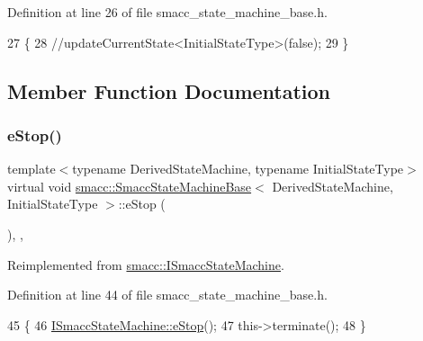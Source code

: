 Definition at line 26 of file smacc\+\_\+state\+\_\+machine\+\_\+base.\+h.


\begin{DoxyCode}
27     \{
28         \textcolor{comment}{//updateCurrentState<InitialStateType>(false);}
29     \}
\end{DoxyCode}


\subsection{Member Function Documentation}
\mbox{\label{structsmacc_1_1SmaccStateMachineBase_a3ba186af957cfe4ddbd7bdbe10630743}} 
\subsubsection{\texorpdfstring{e\+Stop()}{eStop()}}
{\footnotesize\ttfamily template$<$typename Derived\+State\+Machine, typename Initial\+State\+Type$>$ \\
virtual void \hyperlink{structsmacc_1_1SmaccStateMachineBase}{smacc\+::\+Smacc\+State\+Machine\+Base}$<$ Derived\+State\+Machine, Initial\+State\+Type $>$\+::e\+Stop (\begin{DoxyParamCaption}{ }\end{DoxyParamCaption})\hspace{0.3cm}{\ttfamily [inline]}, {\ttfamily [override]}, {\ttfamily [virtual]}}



Reimplemented from \hyperlink{classsmacc_1_1ISmaccStateMachine_a66a2900be8629748dab7a5c5ab6ae94e}{smacc\+::\+I\+Smacc\+State\+Machine}.



Definition at line 44 of file smacc\+\_\+state\+\_\+machine\+\_\+base.\+h.


\begin{DoxyCode}
45     \{
46         \hyperlink{classsmacc_1_1ISmaccStateMachine_a66a2900be8629748dab7a5c5ab6ae94e}{ISmaccStateMachine::eStop}();
47         this->terminate();
48     \}
\end{DoxyCode}
\mbox{\label{structsmacc_1_1SmaccStateMachineBase_a2dc1cd9a25b80f00602f1faab9b01e7b}} 
